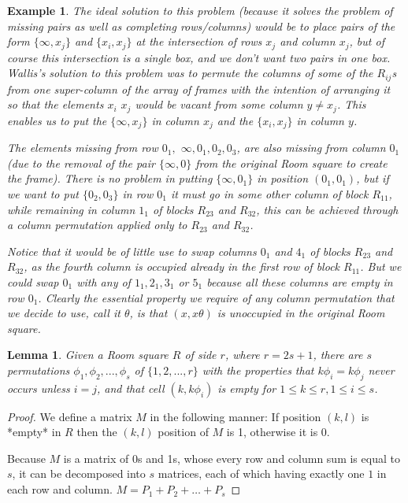 \documentclass[
  11pt,
  a4paper]{book}
\newtheorem{example}{Example}
\newtheorem{lemma}[theorem]{Lemma}
\begin{document}
\begin{example}
The ideal solution to this problem
(because it solves the problem of missing pairs as well as
completing rows/columns) would be to place pairs of the form
$\{\infty, x_j\}$ and $\{x_i, x_j\}$ at the intersection of
rows $x_j$ and column $x_j$, but of course this intersection
is a single box, and we don’t want two pairs in one box.
Wallis’s solution to this problem was to permute the columns
of some of the $R_{ij}$s from one super-column of the array
of frames with the intention of arranging it so that the
elements $x_i$ $x_j$ would be vacant from some column
$y \neq x_j$. This enables us to put the $\{\infty, x_j\}$ in
column $x_j$ and the $\{x_i,x_j\}$ in column $y$.

The elements missing from row $0_1,$ $\infty, 0_1, 0_2, 0_3$,
are also missing from column $0_1$ (due to the removal
of the pair $\{\infty,0\}$ from the original Room square to
create the frame). There is no problem in putting
$\{\infty,0_1\}$ in position $(0_1,0_1)$, but if we want to
put $\{0_2,0_3\}$ in row $0_1$ it must go in some other
column of block $R_{11}$, while remaining in column $1_1$ of
blocks $R_{23}$ and $R_{32}$, this can be achieved through a
column permutation applied only to $R_{23}$ and $R_{32}$.

Notice that it would be of little use to swap columns $0_1$
and $4_1$ of blocks $R_{23}$ and $R_{32}$, as the fourth
column is occupied already in the first row of block
$R_{11}$. But we could swap $0_1$ with any of $1_1,2_1,3_1$
or $5_1$ because all these columns are empty in row $0_1$.
Clearly the essential property we require of any column
permutation that we decide to use, call it $\theta$, is that
$(x,x\theta)$ is unoccupied in the original Room square.
\end{example}

\begin{lemma}
Given a Room square $R$ of side $r$, where $r=2s+1$, there
are $s$ permutations $\phi_1,\phi_2,...,\phi_s$ of
$\{1,2,...,r\}$ with the properties that $k\phi_i=k\phi_j$
never occurs unless $i=j$, and that cell $(k,k\phi_i)$ is
empty for $1 \leq k \leq r, 1 \leq i\leq s$.
\end{lemma}

\begin{proof}
We define a matrix $M$ in the following manner: If position
$(k,l)$ is *empty* in $R$ then the $(k,l)$ position of $M$
is 1, otherwise it is 0.

Because $M$ is a matrix of 0s and 1s, whose every row and
column sum is equal to $s$, it can be decomposed into $s$
matrices, each of which having exactly one $1$ in each row
and column.
$M = P_1 + P_2 + \ldots + P_s$
\end{proof}
\end{document}
